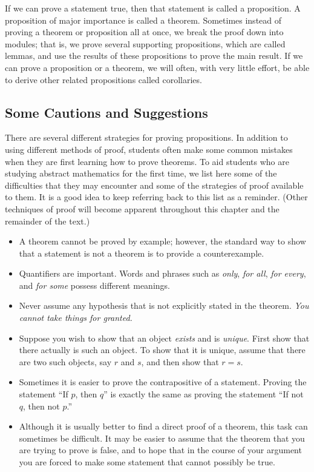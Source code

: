 If we can prove a statement true, then that statement is called a {\bfi proposition}.  A proposition of major importance is called a {\bfi theorem}.  Sometimes instead of proving a theorem or proposition all at once, we break the proof down into modules; that is, we prove several supporting propositions, which are called {\bfi lemmas}, and use the results of these propositions to prove the main result. If we can prove a proposition or a theorem, we will often, with very little effort, be able to derive other related propositions called {\bfi corollaries}. 
 
 
\subsection*{Some Cautions and Suggestions}
 
There are several different strategies for proving propositions.  In addition to using different methods of proof, students often make some common mistakes when they are first learning how to prove theorems. To aid students who are studying abstract mathematics for the first time, we list here some of the difficulties that they may encounter and some of the strategies of proof available to them. It is a good idea to keep referring back to this list as a reminder. (Other techniques of proof will become apparent throughout this chapter and the remainder of the text.) 
\begin{itemize}
 
\item
A theorem cannot be proved by example; however, the standard way to show that a statement is not a theorem is to provide a counterexample. 
 
\item
Quantifiers are important. Words and phrases such as {\em only}, {\em for all}, {\em for every}, and {\em for some\/} possess different meanings. 
 
\item
Never assume any hypothesis that is not explicitly stated in the theorem.  {\em You cannot take things for granted.} 
 
\item
Suppose you wish to show that an object {\em exists\/} and is {\em unique}.  First show that there actually is such an object.  To show that it is unique, assume that there are two such objects, say $r$ and $s$, and then show that $r = s$.
 
\item
Sometimes it is easier to prove the contrapositive of a statement.  Proving the statement ``If $p$, then $q$'' is exactly the same as proving the statement ``If not $q$, then not $p$.''
 
\item
Although it is usually better to find a direct proof of a theorem, this task  can sometimes be difficult. It may be easier to assume that the theorem that you are trying to prove is false, and to hope that in the course of your argument you are forced to make some statement that cannot possibly be true.
 
\end{itemize}

